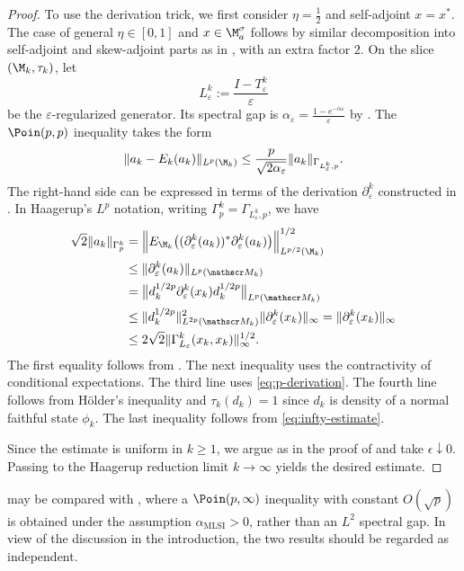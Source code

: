\documentclass[sn-mathphys-num]{sn-jnl}
\begin{document}
\begin{proof}
To use the derivation trick, we first consider $\eta=\frac12$ and
self-adjoint $x=x^*$. The case of general $\eta\in[0,1]$ and
$x\in\M^\sigma_a$ follows by similar decomposition into self-adjoint and skew-adjoint parts as
in , with an extra factor $2$.
On the slice $(\M_k,\tau_k)$, let
\[
  L^k_\varepsilon:=\frac{I-T^k_\varepsilon}{\varepsilon}
\]
be the $\varepsilon$-regularized generator. Its spectral gap is $\alpha_\varepsilon=\frac{1-e^{-\alpha\varepsilon}}{\varepsilon}$
by . The $\Poin(p,p)$ inequality takes the form
\[
\|a_k- E_k(a_k)\|_{L^p(\M_k)}
\leq
\frac{p}{\sqrt{2\alpha_\varepsilon}}
\|a_k\|_{\Gamma_{L^k_{\varepsilon},p}}.
\]
The right-hand side can be expressed in terms of the derivation
$\partial^k_{\varepsilon}$ constructed in . In
Haagerup's $L^p$ notation, writing
$\Gamma_p^k=\Gamma_{L^k_{\varepsilon},p}$, we have
\begin{align*}
\sqrt{2}
\|a_k\|_{\Gamma_p^k}
&=
\Bigl\|
E_{\M_k}\bigl(
(\partial^k_{\varepsilon}(a_k))^*
\partial^k_{\varepsilon}(a_k)
\bigr)
\Bigr\|_{L^{p/2}(\M_k)}^{1/2}                              \\
&\le
\|\partial^k_{\varepsilon}(a_k)\|_{L^p(\mathscr M_k)}              \\
&=
\bigl\|
d_k^{1/2p}
\partial^k_{\varepsilon}(x_k)
d_k^{1/2p}
\bigr\|_{L^p(\mathscr M_k)}                                        \\
&\le
\|d_k^{1/2p}\|_{L^{2p}(\mathscr M_k)}^2
\|\partial^k_{\varepsilon}(x_k)\|_{\infty}                       =
\|\partial^k_{\varepsilon}(x_k)\|_{\infty}                         \\
&\le
2\sqrt{2}
\|\Gamma^k_{L_\varepsilon}(x_k,x_k)\|_{\infty}^{1/2}.
\end{align*}
The first equality follows from . The next
inequality uses the contractivity of conditional expectations. The third
line uses \cref{eq:p-derivation}. The fourth line follows from
H\"older's inequality and $\tau_k(d_k)=1$ since $d_k$ is density of a normal faithful state $\phi_k$. The last inequality follows from
\cref{eq:infty-estimate}.

Since the estimate is uniform in $k\ge1$, we argue as in the proof of
 and take $\epsilon\downarrow 0$. Passing to the Haagerup reduction limit
$k\to\infty$ yields the desired estimate.
\end{proof}
\begin{remark}
 may be compared with \cite[Theorem~5.12]{Gao_Junge_LaRacuente_Li_2025}, where a $\Poin(p,\infty)$ inequality with constant $O(\sqrt p)$ is obtained under the assumption $\alpha_{\mathrm{MLSI}}>0$, rather than an $L^2$ spectral gap.
In view of the discussion in the introduction, the two results should be regarded as independent.
\end{remark}
\end{document}
